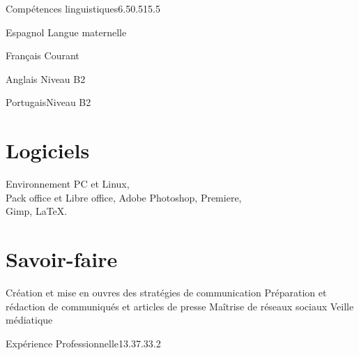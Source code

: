 \documentclass[30pt, french]{tccv}
\begin{document}
\begin{upshape}
\begin{rounded_frame}{Compétences linguistiques}{6.5}{0.5}{15.5}{}


\begin{factlist}
\item{Espagnol} {Langue maternelle}	
\item{Français} {Courant}	
\item{Anglais}  {Niveau B2}	
\item{Portugais}{Niveau B2}
\end{factlist}

\vspace{0.5cm}
\section{Logiciels}
Environnement PC et Linux, \\
Pack office et Libre office,
Adobe Photoshop, Premiere, \\
Gimp,
\LaTeX.

\vspace{0.1cm}
\section{Savoir-faire}
\begin{itemize}[leftmargin=13pt]
  \cvitem[\checkmark]  Création et mise en ouvres des stratégies de communication
  \cvitem[\checkmark]  Préparation et rédaction de communiqués et articles de presse
  \cvitem[\checkmark]  Maîtrise de réseaux sociaux
  \cvitem[\checkmark]  Veille médiatique 
\end{itemize}



\end{rounded_frame}




%
%



\begin{flat_frame}{Expérience Professionnelle}{13.3}{7.3}{3.2}{}
\begin{eventlist}




\end{eventlist}
\end{flat_frame}
\end{upshape}
\end{document}
